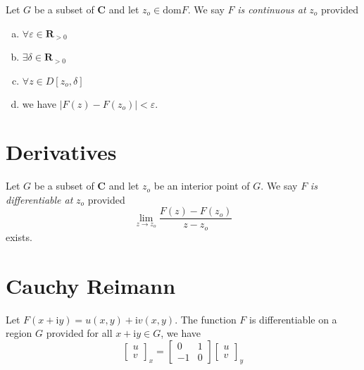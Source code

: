 \documentclass[letterpaper,landscape,9pt,fleqn]{extarticle}
\newcommand{\dom}{\mathrm{dom}}
\newcommand{\reals}{\mathbf{R}}
\newcommand{\complex}{\mathbf{C}}
\newcommand{\im}{\mathrm{i}}
\newenvironment{alphalist}{
  \begin{enumerate}[(a)]
    \addtolength{\itemsep}{-1.0\itemsep}}
  {\end{enumerate}}
\begin{document}
\begin{multicols*}{3}
Let $G$ be a subset of $\complex$ and let $z_o \in \dom{F}$. We say $F$ \emph{is continuous at} $z_o$ provided
\begin{alphalist}
\item $\forall \varepsilon \in \reals_{>0}$
\item $\exists \delta  \in \reals_{>0}$
\item $\forall z \in D[z_o, \delta] $
\item we have $|F(z) - F(z_o)| < \varepsilon$.
\end{alphalist}

\section*{Derivatives}
Let $G$ be a subset of $\complex$ and let $z_o$ be an interior point of $G$. We say $F$ \emph{is differentiable at} $z_o$ provided 
\begin{equation*}
  \lim_{z\to z_o} \frac{F(z) - F(z_o)}{z-z_o}
\end{equation*}
exists.

\section*{Cauchy Reimann}
Let  $F(x+\im y) = u(x,y) + \im v(x,y)$. The function $F$
is differentiable on a region $G$ provided for all
$x + \im y \in G$, we have
\begin{equation*}
\begin{bmatrix} u \\  v \end{bmatrix}_x = 
\begin{bmatrix} 0 & 1 \\ -1 & 0 \end{bmatrix}
\begin{bmatrix} u \\  v \end{bmatrix}_y 
\end{equation*}
\vfill
{}
\end{multicols*}%
\end{document}
